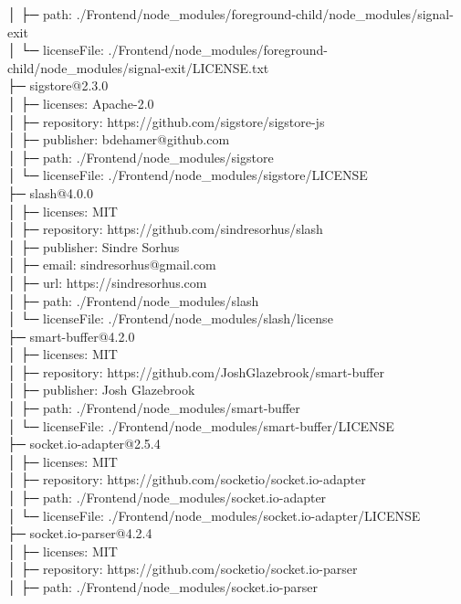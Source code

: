 │  ├─ path: ./Frontend/node\_modules/foreground-child/node\_modules/signal-exit\\
│  └─ licenseFile: ./Frontend/node\_modules/foreground-child/node\_modules/signal-exit/LICENSE.txt\\
├─ sigstore@2.3.0\\
│  ├─ licenses: Apache-2.0\\
│  ├─ repository: https://github.com/sigstore/sigstore-js\\
│  ├─ publisher: bdehamer@github.com\\
│  ├─ path: ./Frontend/node\_modules/sigstore\\
│  └─ licenseFile: ./Frontend/node\_modules/sigstore/LICENSE\\
├─ slash@4.0.0\\
│  ├─ licenses: MIT\\
│  ├─ repository: https://github.com/sindresorhus/slash\\
│  ├─ publisher: Sindre Sorhus\\
│  ├─ email: sindresorhus@gmail.com\\
│  ├─ url: https://sindresorhus.com\\
│  ├─ path: ./Frontend/node\_modules/slash\\
│  └─ licenseFile: ./Frontend/node\_modules/slash/license\\
├─ smart-buffer@4.2.0\\
│  ├─ licenses: MIT\\
│  ├─ repository: https://github.com/JoshGlazebrook/smart-buffer\\
│  ├─ publisher: Josh Glazebrook\\
│  ├─ path: ./Frontend/node\_modules/smart-buffer\\
│  └─ licenseFile: ./Frontend/node\_modules/smart-buffer/LICENSE\\
├─ socket.io-adapter@2.5.4\\
│  ├─ licenses: MIT\\
│  ├─ repository: https://github.com/socketio/socket.io-adapter\\
│  ├─ path: ./Frontend/node\_modules/socket.io-adapter\\
│  └─ licenseFile: ./Frontend/node\_modules/socket.io-adapter/LICENSE\\
├─ socket.io-parser@4.2.4\\
│  ├─ licenses: MIT\\
│  ├─ repository: https://github.com/socketio/socket.io-parser\\
│  ├─ path: ./Frontend/node\_modules/socket.io-parser\\
